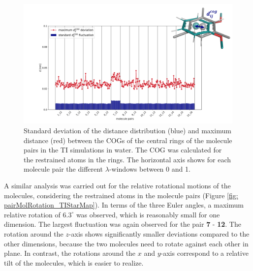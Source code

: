 \begin{figure}[h!]
    \centering
    \includegraphics[width=\textwidth]{fig/results/pairwise/sampling/TI_pairwise_dCOG_fluctuations.png}
    \caption{Standard deviation of the distance distribution (blue) and maximum distance (red) between the COGs of the central rings of the molecule pairs in the TI simulations in water. The COG was calculated for the restrained atoms in the rings. The horizontal axis shows for each molecule pair the different $\lambda$-windows between 0 and 1.}
    \label{fig: pairCOGDist_TIStarMa}
\end{figure}

A similar analysis was carried out for the relative rotational motions of the molecules, considering the restrained atoms in the molecule pairs (Figure \ref{fig: pairMolRotation_TIStarMap}). In terms of the three Euler angles, a maximum relative rotation of $6.3^\circ$ was observed, which is reasonably small for one dimension. The largest fluctuation was again observed for the pair \textbf{7} - \textbf{12}. The rotation around the $z$-axis shows significantly smaller deviations compared to the other dimensions, because the two molecules need to rotate against each other in plane. In contrast, the rotations around the $x$ and $y$-axis correspond to a relative tilt of the molecules, which is easier to realize. 
 

